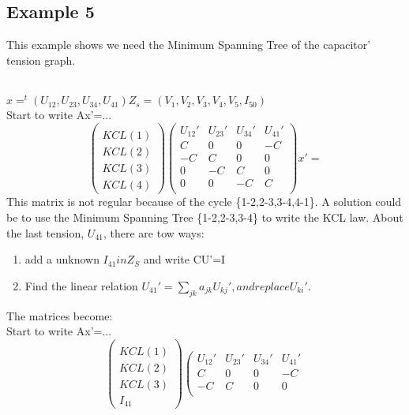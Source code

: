 \documentclass[10pt]{article}
\begin{document}
\subsection{Example 5}
This example shows we need the Minimum Spanning Tree of the capacitor' tension graph.\\
\begin{figure}[h]
\centerline{
 \scalebox{0.6}{
    
 }
}\end{figure}\\
$x=^{t}(U_{12},U_{23},U_{34},U_{41})$$Z_{s}=(V_{1},V_{2},V_{3},V_{4},V_{5},I_{50})$\\
Start to write Ax'=...\
\[\left(\begin{array}{c}
  \\
KCL(1)\\KCL(2)\\KCL(3)\\KCL(4)
\end{array}\right)
\left(\begin{array}{cccc}
  U_{12}'&U_{23}'&U_{34}'&U_{41}'\\
  \hline
  C&0&0&-C\\
  -C&C&0&0\\
  0&-C&C&0\\
  0&0&-C&C\\  
\end{array}\right)x'=
\]
This matrix is not regular because of the cycle \{1-2,2-3,3-4,4-1\}. A solution could be to use the Minimum
Spanning Tree \{1-2,2-3,3-4\} to write the KCL law. About the last tension, $U_{41}$, there are tow
ways:
\begin{enumerate}
\item add a unknown $I_{41} in Z_{S}$ and write CU'=I
\item Find the linear relation $U_{41}'= \sum_{jk}^{}a_{jk}U_{kj}', and replace U_{ki}'$.
\end{enumerate}
The matrices become:\\
Start to write Ax'=...\
\[\left(\begin{array}{c}
  \\
KCL(1)\\KCL(2)\\KCL(3)\\I_{41}
\end{array}\right)
\left(\begin{array}{cccc}
  U_{12}'&U_{23}'&U_{34}'&U_{41}'\\
  \hline
  C&0&0&-C\\
  -C&C&0&0\\

\end{array}\]$$
\end{document}
